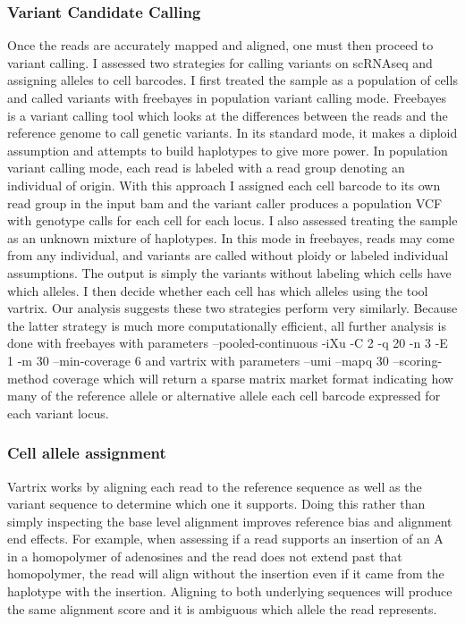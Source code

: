 \subsubsection{Variant Candidate Calling}
\par{
Once the reads are accurately mapped and aligned, one must then proceed to variant calling. I assessed two strategies for calling variants on scRNAseq and assigning alleles to cell barcodes. I first treated 
the sample as a population of cells and called variants with freebayes in population variant calling mode\cite{freebayes}\cite{gatk}\cite{samtools}. Freebayes is a variant calling tool which looks at the differences between the reads and the reference genome to call genetic variants. In its standard mode, it makes a diploid assumption and attempts to build haplotypes to give more power. In population variant calling mode, each read is labeled with a read group denoting an individual of origin. With this approach I assigned each cell barcode to its own read group in the input bam and the variant caller produces a population VCF with genotype calls for each cell for each locus. 
I also assessed treating the sample as an unknown mixture of haplotypes. In this mode in freebayes, reads may come from any individual, and variants are called without ploidy or labeled individual assumptions. The output is simply the variants without labeling which cells have which alleles. I then decide whether each cell has which alleles using the tool vartrix\cite{vartrix}. Our analysis suggests these two strategies perform very similarly. Because the latter strategy is much more computationally efficient, all further analysis is done with freebayes with parameters --pooled-continuous -iXu -C 2 -q 20 -n 3 -E 1 -m 30 --min-coverage 6 and vartrix with parameters  --umi --mapq 30 --scoring-method coverage which will return a sparse matrix market format indicating how many of the reference allele or alternative allele each cell barcode expressed for each variant locus.
}
\subsubsection{Cell allele assignment}
\par{
 Vartrix works by aligning each read to the reference sequence as well as the variant sequence to determine which one it supports. Doing this rather than simply inspecting the base level alignment improves reference bias and alignment end effects. For example, when assessing if a read supports an insertion of an A in a homopolymer of adenosines and the read does not extend past that homopolymer, the read will align without the insertion even if it came from the haplotype with the insertion. Aligning to both underlying sequences will produce the same alignment score and it is ambiguous which allele the read represents.
}
